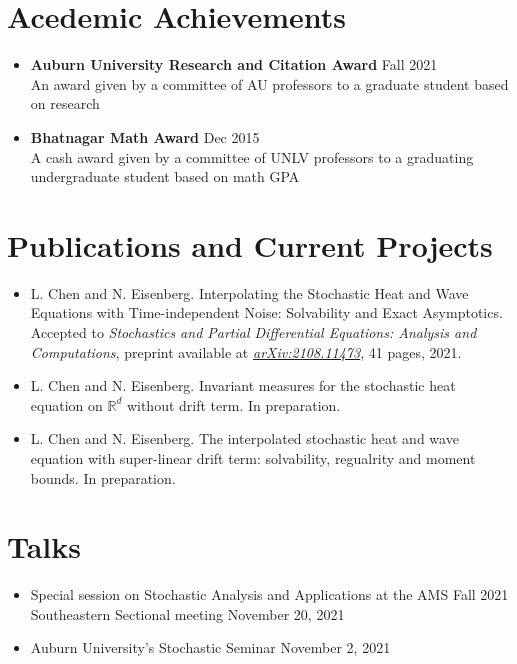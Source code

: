 \documentclass[letterpaper,12pt]{article}
\begin{document}
  
\section{Acedemic Achievements}
\begin{itemize}[noitemsep, topsep=0pt]
	    \item \noindent \textbf{Auburn University Research and Citation Award} \hfill Fall 2021 \\
	An award given by a committee of AU professors to a graduate student based on research
	
    \item \noindent \textbf{Bhatnagar Math Award} \hfill Dec 2015 \\
     A cash award given by a committee of UNLV professors to a graduating undergraduate student based on math GPA 
 
\end{itemize}



  



 
 \section{Publications and Current Projects}
 
\begin{itemize}

\item \noindent L. Chen and N. Eisenberg. Interpolating the Stochastic Heat and Wave Equations with Time-independent Noise:
Solvability and Exact Asymptotics. Accepted to {\em Stochastics and Partial Differential Equations: Analysis and Computations}, preprint available at \href{https://arxiv.org/abs/2108.11473}{\textit{arXiv:2108.11473}}, 41 pages, 2021.

\item \noindent L. Chen and N. Eisenberg. Invariant measures for the stochastic heat equation on $\mathbb{R}^d$ without drift term. In preparation.

\item \noindent L. Chen and N. Eisenberg. The interpolated stochastic heat and wave equation with super-linear drift term: solvability, regualrity and moment bounds. In preparation.

\end{itemize}
 \section{Talks}
 
\begin{itemize}
\item \noindent Special session on Stochastic Analysis and Applications at the AMS Fall 2021 \\ Southeastern Sectional meeting \hfill November 20, 2021

\item \noindent Auburn University's Stochastic Seminar \hfill November 2, 2021
\end{itemize}
%



\end{document}
